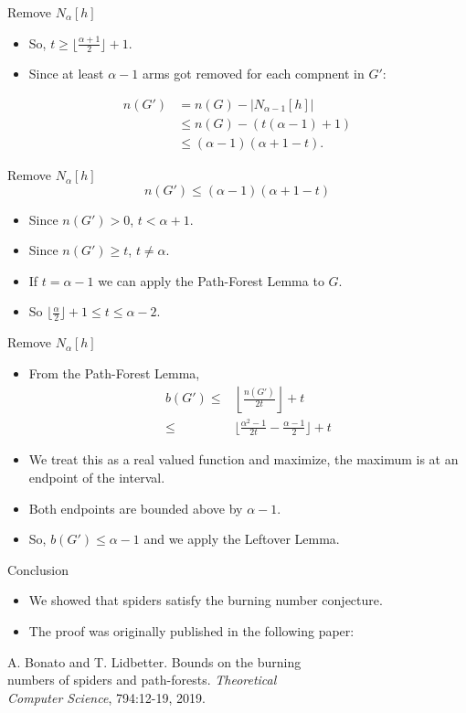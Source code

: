 \documentclass{beamer}
\begin{document}
\begin{frame}{Remove $N_\alpha[h]$}
\begin{itemize}
\item So, $t \geq \lfloor \frac{\alpha + 1}{2} \rfloor + 1$.
\item Since at least $\alpha - 1$ arms got removed for each compnent in $G'$:
\end{itemize}
\begin{align*}
    n(G')&= n(G) - |N_{\alpha - 1}[h]|\\
    &\leq n(G) - (t(\alpha - 1) + 1)\\
    &\leq (\alpha - 1)(\alpha + 1 - t).
\end{align*}
\end{frame}

\begin{frame}{Remove $N_\alpha[h]$}
    $$n(G') \leq (\alpha - 1)(\alpha + 1 - t)$$
\begin{itemize}
\item Since $n(G') > 0$, $t < \alpha + 1$.
\item Since $n(G') \geq t$, $t \neq \alpha$.
\item If $t = \alpha - 1$ we can apply the Path-Forest Lemma to $G$.
\item So $\lfloor \frac{\alpha}{2} \rfloor + 1 \leq t \leq \alpha - 2$.
\end{itemize}
\end{frame}

\begin{frame}{Remove $N_\alpha[h]$}
\begin{itemize}
\item From the Path-Forest Lemma,
\begin{align*}
    b(G') \leq& \left\lfloor \frac{n(G')}{2t} \right\rfloor + t\\
    \leq& \lfloor \frac{\alpha^2 - 1}{2t} - \frac{\alpha - 1}{2} \rfloor + t
\end{align*}
\item We treat this as a real valued function and maximize, the maximum is at an endpoint of the interval.
\item Both endpoints are bounded above by $\alpha - 1$.
\item So, $b(G') \leq \alpha - 1$ and we apply the Leftover Lemma.
\end{itemize}
\end{frame}

\begin{frame}{Conclusion}
\begin{itemize}
\item We showed that spiders satisfy the burning number conjecture.
\item The proof was originally published in the following paper:
\end{itemize}
\hspace{0.7cm} A. Bonato and T. Lidbetter. Bounds on the burning\\
\hspace{0.7cm} numbers of spiders and path-forests. \textit{Theoretical \\
\hspace{0.7cm} Computer Science}, 794:12-19, 2019.
\end{frame}
\end{document}
